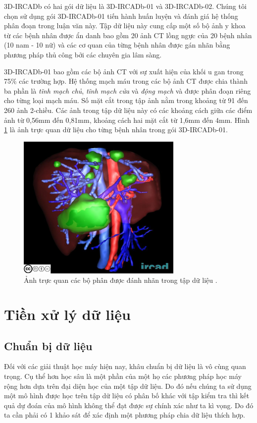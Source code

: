 3D-IRCADb có hai gói dữ liệu là 3D-IRCADb-01 và 3D-IRCADb-02. Chúng tôi chọn sử dụng gói 3D-IRCADb-01 tiến hành huấn luyện và đánh giá hệ thống phân đoạn trong luận văn này. Tập dữ liệu này cung cấp một số bộ ảnh y khoa từ các bệnh nhân được ẩn danh bao gồm 20 ảnh CT lồng ngực của 20 bệnh nhân (10 nam - 10 nữ) và các cơ quan của từng bệnh nhân được gán nhãn bằng phương pháp thủ công bởi các chuyên gia lâm sàng. \par

 3D-IRCADb-01 bao gồm các bộ ảnh CT với sự xuất hiện của khối u gan trong 75\% các trường hợp. Hệ thống mạch máu trong các bộ ảnh CT được chia thành ba phần là \textit{tĩnh mạch chủ}, \textit{tĩnh mạch cửa} và \textit{động mạch} và được phân đoạn riêng cho từng loại mạch máu. Số mặt cắt trong tập ảnh nằm trong khoảng từ 91 đến 260 ảnh 2-chiều. Các ảnh trong tập dữ liệu này có các khoảng cách giữa các điểm ảnh từ 0,56mm đến 0,81mm, khoảng cách hai mặt cắt từ 1,6mm đến 4mm. Hình \ref{3dircad_sample} là ảnh trực quan dữ liệu cho từng bệnh nhân trong gói 3D-IRCADb-01. 

\begin{figure}[H]
    \centering
    \includegraphics[width=8cm]{images/dataset/3Dircadb1.jpg}
    \caption{Ảnh trực quan các bộ phân được đánh nhãn trong tập dữ liệu \cite{3dircad}.}
    \label{3dircad_sample}
\end{figure}
\vspace{-10mm}

\section{Tiền xử lý dữ liệu}
\subsection{Chuẩn bị dữ liệu} \label{data-preparation}
Đối với các giải thuật học máy hiện nay, khâu chuẩn bị dữ liệu là vô cùng quan trọng. Cụ thể hơn học sâu là một phần của một họ các phương pháp học máy rộng hơn dựa trên đại diện học của một tập dữ liệu. Do đó nếu chúng ta sử dụng một mô hình được học trên tập dữ liệu có phân bố khác với tập kiểm tra thì kết quả dự đoán của mô hình không thể đạt được sự chính xác như ta kì vọng. Do đó ta cần phải có 1 khảo sát để xác định một phương pháp chia dữ liệu thích hợp.\par

